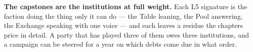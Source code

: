 \textbf{The capstones are the institutions at full weight.} Each L5 signature is the faction doing the thing only it can do --- the Table leaning, the Pool answering, the Exchange speaking with one voice --- and each leaves a residue the chapters price in detail. A party that has played three of them owes three institutions, and a campaign can be steered for a year on which debts come due in what order.
